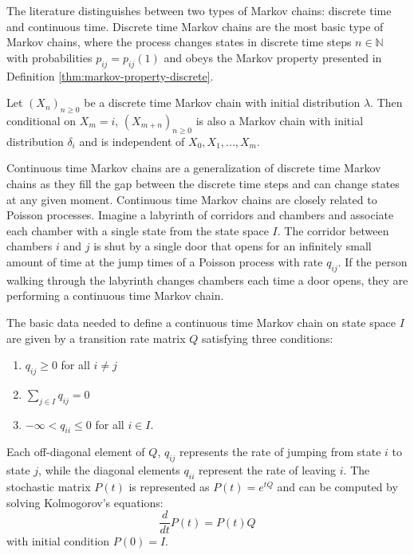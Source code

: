 The literature distinguishes between two types of Markov chains: discrete time and continuous time.
Discrete time Markov chains are the most basic type of Markov chains, where the process
changes states in discrete time steps $n \in \mathbb{N}$ with probabilities $p_{ij} = p_{ij}(1)$
and obeys the Markov property presented in Definition \ref{thm:markov-property-discrete}.

\begin{defn}
\label{thm:markov-property-discrete}
Let $(X_n)_{n \ge 0}$ be a discrete time Markov chain with initial distribution $\lambda$.
Then conditional on $X_m = i$, $(X_{m + n})_{n \ge 0}$ is also a Markov chain with initial
distribution $\delta_i$ and is independent of $X_0, X_1, ..., X_m$.
\end{defn}

Continuous time Markov chains are a generalization of discrete time Markov chains as they
fill the gap between the discrete time steps and can change states at any given moment.
Continuous time Markov chains are closely related to Poisson processes. Imagine a labyrinth
of corridors and chambers and associate each chamber with a single state from the state space
$I$. The corridor between chambers $i$ and $j$
is shut by a single door that opens for an infinitely small amount of time at the jump times of
a Poisson process with rate $q_{ij}$. If the person walking through the labyrinth changes
chambers each time a door opens, they are performing
a continuous time Markov chain.

The basic data needed to define a continuous time Markov chain on state space $I$ are
given by a transition rate matrix $Q$ satisfying three conditions:

\begin{enumerate}
	\item $q_{ij} \ge 0$ for all $i \ne j$
	\item $\sum_{j \in I} q_{ij} = 0$
	\item $-\infty < q_{ii} \le 0$ for all $i \in I$.
\end{enumerate}

Each off-diagonal element of $Q$, $q_{ij}$ represents the rate of jumping from state $i$ to state $j$,
while the diagonal elements $q_{ii}$ represent the rate of leaving $i$. The stochastic matrix
$P(t)$ is represented as $P(t) = e^{tQ}$ and can be computed by solving Kolmogorov's equations:
\begin{equation}
	\nonumber
	\frac{d}{dt}P(t) = P(t)Q
\end{equation}
with initial condition $P(0) = I$.

